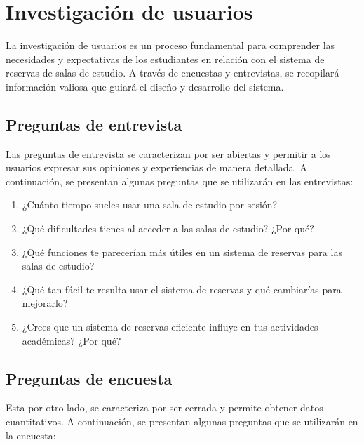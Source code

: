 \documentclass{article}
\begin{document}
\section{Investigación de usuarios}

La investigación de usuarios es un proceso fundamental para comprender las necesidades y expectativas de los estudiantes en relación con el sistema de reservas de salas de estudio. A través de encuestas y entrevistas, se recopilará información valiosa que guiará el diseño y desarrollo del sistema.

\subsection{Preguntas de entrevista}

Las preguntas de entrevista se caracterizan por ser abiertas y permitir a los usuarios expresar sus opiniones y experiencias de manera detallada. A continuación, se presentan algunas preguntas que se utilizarán en las entrevistas:

\begin{enumerate}
  \item ¿Cuánto tiempo sueles usar una sala de estudio por sesión?
  \item ¿Qué dificultades tienes al acceder a las salas de estudio? ¿Por qué?
  \item ¿Qué funciones te parecerían más útiles en un sistema de reservas para las salas de estudio?
  \item ¿Qué tan fácil te resulta usar el sistema de reservas y qué cambiarías para mejorarlo?
  \item ¿Crees que un sistema de reservas eficiente influye en tus actividades académicas? ¿Por qué?
\end{enumerate}

\subsection{Preguntas de encuesta}

Esta por otro lado, se caracteriza por ser cerrada y permite obtener datos cuantitativos. A continuación, se presentan algunas preguntas que se utilizarán en la encuesta:
\end{document}
